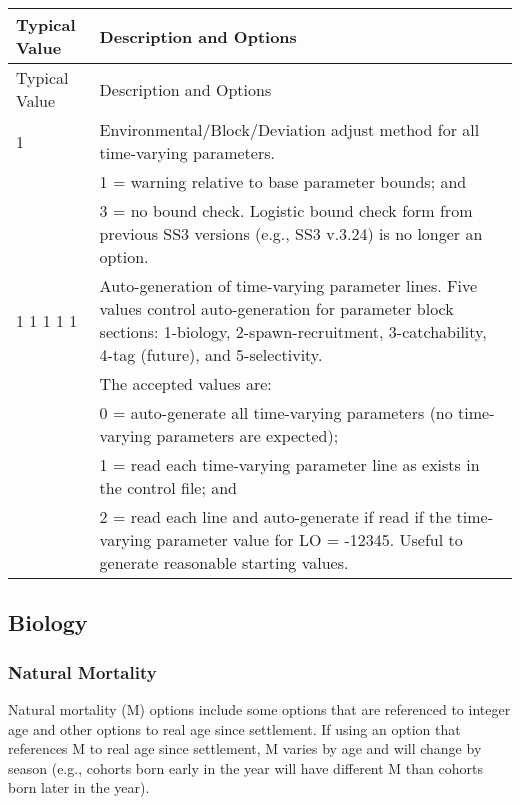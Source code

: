 	
\begin{longtable}{p{0.5cm} p{2cm} p{12cm}}
	\hline
	\multicolumn{2}{l}{Typical Value} & Description and Options\Tstrut\Bstrut\\
	\hline
	\endfirsthead

	\hline
	\multicolumn{2}{l}{Typical Value} & Description and Options\Tstrut\Bstrut\\
	\hline
	\endhead

	\hline
	\endfoot

	\endlastfoot

	1 & & Environmental/Block/Deviation adjust method for all time-varying parameters. \Tstrut\\
	  & & 1 = warning relative to base parameter bounds; and \\
	  & & 3 = no bound check. Logistic bound check form from previous SS3 versions (e.g., SS3 v.3.24) is no longer an option.\Bstrut\\

	\multicolumn{2}{l}{1 1 1 1 1} & Auto-generation of time-varying parameter lines. Five values control auto-generation for parameter block sections: 1-biology, 2-spawn-recruitment, 3-catchability, 4-tag (future), and 5-selectivity.\\
	& 			& The accepted values are:\\
	&           & 0 = auto-generate all time-varying parameters (no time-varying parameters are expected);\\
	& 			& 1 = read each time-varying parameter line as exists in the control file; and\\
	&			& 2 = read each line and auto-generate if read if the time-varying parameter value for LO = -12345. Useful to generate reasonable starting values.  \Bstrut\\
	\hline
\end{longtable}


\subsection{Biology}
\subsubsection{Natural Mortality}
Natural mortality (M) options include some options that are referenced to integer age and other options to real age since settlement.  If using an option that references M to real age since settlement, M varies by age and will change by season (e.g., cohorts born early in the year will have different M than cohorts born later in the year).

